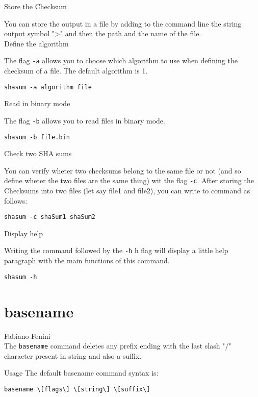 \documentclass[hidelinks,12pt,a4paper,numbers=enddot]{scrartcl}
\begin{document}
Store the Checksum

You can store the output in a file by adding to the command line the string
output symbol "\textgreater " and then the path and the name of the file.\\

Define the algorithm

The flag \texttt{-a} allows you to choose which algorithm to use when
defining the checksum of a file. The default algorithm is 1.

\begin{verbatim}
shasum -a algorithm file
\end{verbatim}

Read in binary mode

The flag \texttt{-b} allows you to read files in binary mode.

\begin{verbatim}
shasum -b file.bin
\end{verbatim}

Check two SHA sums

You can verify wheter two checksums belong to the same file or not (and so
define wheter the two files are the same thing) wit the flag \texttt{-c}.
After storing the Checksums into two files (let say file1 and file2),
you can write to command as follows:

\begin{verbatim}
shasum -c shaSum1 shaSum2
\end{verbatim}

Display help

Writing the command followed by the \texttt{-h} h flag will display a little
help paragraph with the main functions of this command.

\begin{verbatim}
shasum -h
\end{verbatim}

\section{basename}


\large Fabiano Fenini \normalsize\\


The \texttt{basename} command deletes any prefix ending with the last slash "/" character
present in string and also a suffix.

Usage
The default basename command syntax is:

\begin{verbatim}
basename \[flags\] \[string\] \[suffix\]
\end{verbatim}
\end{document}
